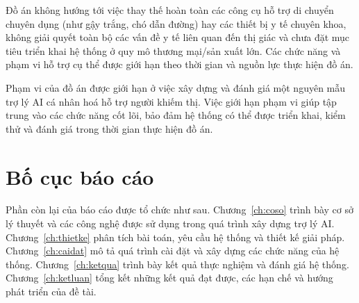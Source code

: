 Đồ án không hướng tới việc thay thế hoàn toàn các công cụ hỗ trợ di chuyển chuyên dụng
(như gậy trắng, chó dẫn đường) hay các thiết bị y tế chuyên khoa, không giải quyết
toàn bộ các vấn đề y tế liên quan đến thị giác và chưa đặt mục tiêu triển khai hệ thống
ở quy mô thương mại/sản xuất lớn. Các chức năng và phạm vi hỗ trợ cụ thể được giới hạn
theo thời gian và nguồn lực thực hiện đồ án.

\begin{luuy}
Phạm vi của đồ án được giới hạn ở việc xây dựng và đánh giá một nguyên mẫu
trợ lý AI cá nhân hoá hỗ trợ người khiếm thị. Việc giới hạn phạm vi giúp
tập trung vào các chức năng cốt lõi, bảo đảm hệ thống có thể được triển khai,
kiểm thử và đánh giá trong thời gian thực hiện đồ án.
\end{luuy}

\section{Bố cục báo cáo}

Phần còn lại của báo cáo được tổ chức như sau. Chương~\ref{ch:coso} trình
bày cơ sở lý thuyết và các công nghệ được sử dụng trong quá trình xây dựng
trợ lý AI. Chương~\ref{ch:thietke} phân tích bài toán, yêu cầu hệ thống và
thiết kế giải pháp. Chương~\ref{ch:caidat} mô tả quá trình cài đặt và xây
dựng các chức năng của hệ thống. Chương~\ref{ch:ketqua} trình bày kết quả
thực nghiệm và đánh giá hệ thống. Chương~\ref{ch:ketluan} tổng kết những
kết quả đạt được, các hạn chế và hướng phát triển của đề tài.